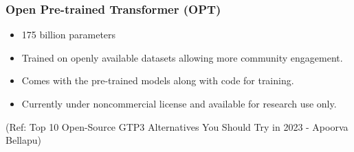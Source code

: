 \begin{frame}[fragile]\frametitle{Open Pre-trained Transformer (OPT) }

\begin{itemize}
\item 175 billion parameters
\item Trained on openly available datasets allowing more community engagement. 
\item Comes with the pre-trained models along with code for training.
\item Currently under noncommercial license and available for research use only. 
\end{itemize}	 

\tiny{(Ref: Top 10 Open-Source GTP3 Alternatives You Should Try in 2023 - Apoorva Bellapu)}
\end{frame}



